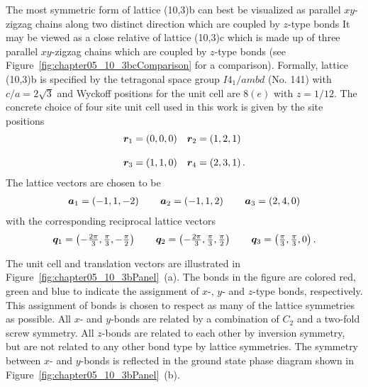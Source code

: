 The most symmetric form of lattice (10,3)b can best be visualized as parallel $xy$-zigzag chains along two distinct direction which are coupled by $z$-type bonds
It may be viewed as a close relative of lattice (10,3)c which is made up of three parallel $xy$-zigzag chains which are coupled by $z$-type bonds (see Figure~\ref{fig:chapter05_10_3bcComparison} for a comparison).
Formally, lattice (10,3)b is specified by the tetragonal space group $I4_{1}/ambd$ (No. 141) with $c/a = 2\sqrt{3}$ and Wyckoff positions for the unit cell are $8(e)$ with $z = 1/12$.
The concrete choice of four site unit cell used in this work is given by the site positions
%
\begin{equation}
	\begin{matrix*}[l]
		\br_1 = \left(0, 0, 0\right) &
		\br_2 = \left(1, 2, 1\right) \\
		&\\
		\br_3 = \left(1, 1, 0\right) &
		\br_4 = \left(2, 3, 1\right).
	\end{matrix*}
\end{equation}
%
The lattice vectors are chosen to be
%
\begin{equation}
	\begin{matrix*}[l]
		\ba_1 = \left(-1, 1, -2\right) \qquad
		\ba_2 = \left(-1, 1, 2\right) \qquad
		\ba_3 = \left(2, 4, 0\right)
	\end{matrix*}
\end{equation}
%
with the corresponding reciprocal lattice vectors
%
\begin{equation}
	\begin{matrix*}[l]
		\bq_1 = \left(-\frac{2\pi}{3}, \frac{\pi}{3}, -\frac{\pi}{2}\right) \qquad
		\bq_2 = \left(-\frac{2\pi}{3}, \frac{\pi}{3}, \frac{\pi}{2}\right) \qquad
		\bq_3 = \left(\frac{\pi}{3}, \frac{\pi}{3}, 0\right).
	\end{matrix*}
\end{equation}
%

The unit cell and translation vectors are illustrated in Figure~\ref{fig:chapter05_10_3bPanel}~(a).
The bonds in the figure are colored red, green and blue to indicate the assignment of $x$-, $y$- and $z$-type bonds, respectively.
This assignment of bonds is chosen to respect as many of the lattice symmetries as possible.
All $x$- and $y$-bonds are related by a combination of $C_2$ and a two-fold screw symmetry.
All $z$-bonds are related to each other by inversion symmetry, but are not related to any other bond type by lattice symmetries.
The symmetry between $x$- and $y$-bonds is reflected in the ground state phase diagram shown in Figure~\ref{fig:chapter05_10_3bPanel}~(b).


